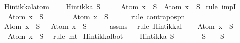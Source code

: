 \begin{isabellebody}
\isamarkupfalse%
\ Hintikka{\isacharunderscore}l{}{}{\isacharunderscore}atom{\isacharcolon}\ \isanewline
\ \ \ {\isachardoublequoteopen}Hintikka\ S{\isachardoublequoteclose}\ \isanewline
\ \ \ {\isachardoublequoteopen}\isactrlbold {\isasymnot}\ {\isacharparenleft}Atom\ x{\isacharparenright}\ {\isasymin}\ S\ {\isasymlongrightarrow}\ Atom\ x\ {\isasymnotin}\ S{\isachardoublequoteclose}\isanewline
%
\isadelimproof
%
\endisadelimproof
%
\isatagproof
{}\isamarkupfalse%
\ {\isacharparenleft}rule\ impI{\isacharparenright}\isanewline
\ \ \isamarkupfalse%
\ {\isachardoublequoteopen}\isactrlbold {\isasymnot}\ {\isacharparenleft}Atom\ x{\isacharparenright}\ {\isasymin}\ S{\isachardoublequoteclose}\isanewline
\ \ \isamarkupfalse%
\ \isamarkupfalse%
\ {\isachardoublequoteopen}{\isasymnot}\ {\isacharparenleft}\isactrlbold {\isasymnot}\ {\isacharparenleft}Atom\ x{\isacharparenright}\ {\isasymnotin}\ S{\isacharparenright}{\isachardoublequoteclose}\isanewline
\ \ \ \ \isamarkupfalse%
\ {\isacharparenleft}rule\ contrapos{\isacharunderscore}pn{\isacharparenright}\isanewline
\ \ \isamarkupfalse%
\ {\isachardoublequoteopen}Atom\ x\ {\isasymin}\ S\ {\isasymlongrightarrow}\ \isactrlbold {\isasymnot}\ {\isacharparenleft}Atom\ x{\isacharparenright}\ {\isasymnotin}\ S{\isachardoublequoteclose}\isanewline
\ \ \ \ \isamarkupfalse%
\ assms\ \isamarkupfalse%
\ {\isacharparenleft}rule\ Hintikka{\isacharunderscore}l{}{\isacharparenright}\isanewline
\ \ \isamarkupfalse%
\ {\isachardoublequoteopen}Atom\ x\ {\isasymnotin}\ S{\isachardoublequoteclose}\isanewline
\ \ \ \ \isamarkupfalse%
\ {\isacartoucheopen}{\isasymnot}{\isacharparenleft}\isactrlbold {\isasymnot}\ {\isacharparenleft}Atom\ x{\isacharparenright}\ {\isasymnotin}\ S{\isacharparenright}{\isacartoucheclose}\ \isamarkupfalse%
\ {\isacharparenleft}rule\ mt{\isacharparenright}\isanewline
{}\isamarkupfalse%
%
\endisatagproof
{\isafoldproof}%
%
\isadelimproof
\isanewline
%
\endisadelimproof
\isanewline
{}\isamarkupfalse%
\ Hintikka{\isacharunderscore}l{}{}{\isacharunderscore}bot{\isacharcolon}\ \isanewline
\ \ \ {\isachardoublequoteopen}Hintikka\ S{\isachardoublequoteclose}\ \isanewline
\ \ \ {\isachardoublequoteopen}\isactrlbold {\isasymnot}\ {\isasymbottom}\ {\isasymin}\ S\ {\isasymlongrightarrow}\ {\isasymbottom}\ {\isasymnotin}\ S{\isachardoublequoteclose}\isanewline

\end{isabellebody}
